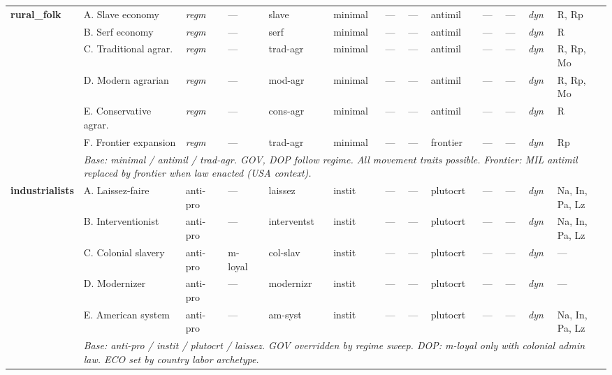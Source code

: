 \documentclass[a4paper]{article}
\newcommand{\nd}{---}
\newcommand{\reg}{\textit{regm}}
\newcommand{\minorrow}[2]{\rowcolor{minorRow} #1 & \multicolumn{12}{p{22cm}|}{\textit{#2}} \\}
\begin{document}
\begin{footnotesize}
\begin{longtable}{|p{1.8cm}|p{2.3cm}|p{1.55cm}|p{1.65cm}|p{1.65cm}|p{1.3cm}|p{1.5cm}|p{1.5cm}|p{1.5cm}|p{1.3cm}|p{1.45cm}|p{1.0cm}|p{2.65cm}|}
\multirow{7}{*}{\cellcolor{instHdr}\textbf{rural\_folk}} &
  A. Slave economy & \reg & \nd & slave & minimal & \nd & \nd & antimil & \nd & \nd & \textit{dyn} & R, Rp \\ \cline{2-13}
\cellcolor{instHdr} &
  B. Serf economy & \reg & \nd & serf & minimal & \nd & \nd & antimil & \nd & \nd & \textit{dyn} & R \\ \cline{2-13}
\cellcolor{instHdr} &
  C. Traditional agrar. & \reg & \nd & trad-agr & minimal & \nd & \nd & antimil & \nd & \nd & \textit{dyn} & R, Rp, Mo \\ \cline{2-13}
\cellcolor{instHdr} &
  D. Modern agrarian & \reg & \nd & mod-agr & minimal & \nd & \nd & antimil & \nd & \nd & \textit{dyn} & R, Rp, Mo \\ \cline{2-13}
\cellcolor{instHdr} &
  E. Conservative agrar. & \reg & \nd & cons-agr & minimal & \nd & \nd & antimil & \nd & \nd & \textit{dyn} & R \\ \cline{2-13}
\cellcolor{instHdr} &
  F. Frontier expansion & \reg & \nd & trad-agr & minimal & \nd & \nd & frontier & \nd & \nd & \textit{dyn} & Rp \\ \cline{2-13}
\minorrow{\cellcolor{instHdr}}{Base: minimal / antimil / trad-agr. GOV, DOP follow regime. All movement traits possible. Frontier: MIL antimil replaced by frontier when law enacted (USA context).}
\hline

\multirow{6}{*}{\cellcolor{instHdr}\textbf{industrialists}} &
  A. Laissez-faire & anti-pro & \nd & laissez & instit & \nd & \nd & plutocrt & \nd & \nd & \textit{dyn} & Na, In, Pa, Lz \\ \cline{2-13}
\cellcolor{instHdr} &
  B. Interventionist & anti-pro & \nd & interventst & instit & \nd & \nd & plutocrt & \nd & \nd & \textit{dyn} & Na, In, Pa, Lz \\ \cline{2-13}
\cellcolor{instHdr} &
  C. Colonial slavery & anti-pro & m-loyal & col-slav & instit & \nd & \nd & plutocrt & \nd & \nd & \textit{dyn} & \nd \\ \cline{2-13}
\cellcolor{instHdr} &
  D. Modernizer & anti-pro & \nd & modernizr & instit & \nd & \nd & plutocrt & \nd & \nd & \textit{dyn} & \nd \\ \cline{2-13}
\cellcolor{instHdr} &
  E. American system & anti-pro & \nd & am-syst & instit & \nd & \nd & plutocrt & \nd & \nd & \textit{dyn} & Na, In, Pa, Lz \\ \cline{2-13}
\minorrow{\cellcolor{instHdr}}{Base: anti-pro / instit / plutocrt / laissez. GOV overridden by regime sweep. DOP: m-loyal only with colonial admin law. ECO set by country labor archetype.}
\hline


\end{longtable}
\end{footnotesize}
\end{document}

